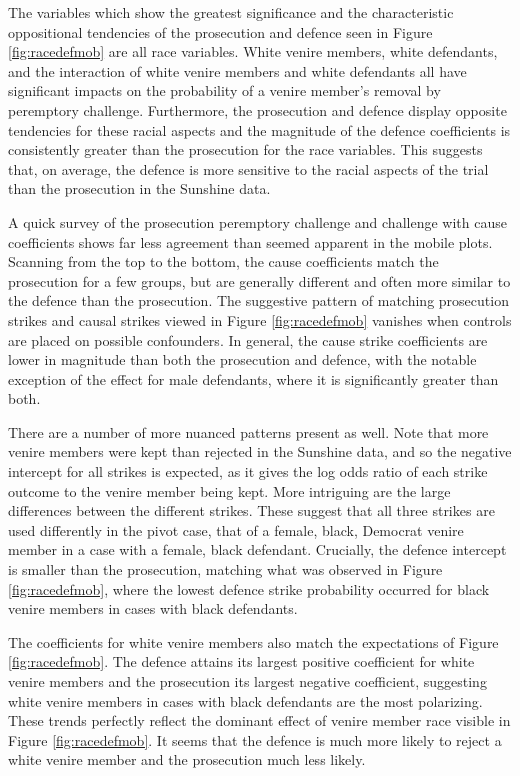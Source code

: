 The variables which show the greatest significance and the characteristic
oppositional tendencies of the prosecution and defence seen in Figure \ref{fig:racedefmob} are all race variables. White venire members, white
defendants, and the interaction of white venire members and white defendants
all have significant impacts on the probability of a venire member's
removal by peremptory challenge. Furthermore, the prosecution and
defence display opposite tendencies for these racial aspects and
the magnitude of the defence coefficients is consistently greater than
the prosecution for the race variables. This suggests that, on
average, the defence is more sensitive to the racial aspects of the
trial than the prosecution in the Sunshine data.

A quick survey of the prosecution peremptory challenge and challenge with cause coefficients shows far less agreement than seemed apparent in the mobile
plots. Scanning from the top to the bottom, the cause coefficients match the prosecution for a few groups, but are generally
different and often more similar to the defence than the prosecution. The suggestive pattern of matching prosecution strikes
and causal strikes viewed in Figure \ref{fig:racedefmob} vanishes when controls are placed on possible confounders. In general, the cause strike
coefficients are lower in magnitude than both the prosecution and defence, with the notable exception of the effect for male
defendants, where it is significantly greater than both.

There are a number of more nuanced patterns present as well. Note that
more venire members were kept than rejected in the Sunshine data, and so the
negative intercept for all strikes is expected, as it gives the log odds ratio of each strike outcome to
the venire member being kept. More intriguing are the large differences
between the different strikes. These suggest that all three
strikes are used differently in the pivot case, that of a female, black,
Democrat venire member in a case with a female, black
defendant. Crucially, the defence intercept is smaller than the prosecution, matching what was observed in Figure \ref{fig:racedefmob}, where the lowest defence strike
probability occurred for black venire members in cases with black
defendants. 

The coefficients for white venire members also match the expectations of Figure \ref{fig:racedefmob}. The defence attains its
largest positive coefficient for white venire members and the prosecution its
largest negative coefficient, suggesting white venire members in cases
with black defendants are the most polarizing. These trends perfectly
reflect the dominant effect of venire member
race visible in Figure \ref{fig:racedefmob}. It seems that the defence is much more
likely to reject a white venire member and the prosecution much less
likely.

